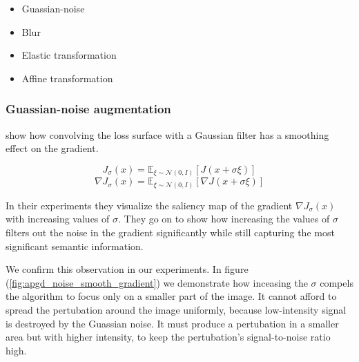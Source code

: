 \begin{itemize}
    \item Guassian-noise
    \item Blur
    \item Elastic transformation
    \item Affine transformation
\end{itemize}


\subsubsection{Guassian-noise augmentation}

\cite{Wu2020TowardsUA} show how convolving the loss surface with a Gaussian filter has a smoothing effect on the gradient.

$$J_{\sigma}(x) = \mathbb{E}_{\xi \sim \mathcal{N}(0, I)}[J(x + \sigma \xi)]$$
$$\nabla J_{\sigma}(x) = \mathbb{E}_{\xi \sim \mathcal{N}(0, I)}[\nabla J(x + \sigma \xi)]$$

In their experiments they visualize the saliency map of the gradient $\nabla J_{\sigma}(x)$ with increasing values of $\sigma$.
They go on to show how increasing the values of $\sigma$ filters out the noise in the gradient significantly while still capturing the most significant semantic information. 

We confirm this observation in our experiments. In figure (\ref{fig:apgd_noise_smooth_gradient}) we demonstrate how inceasing the $\sigma$ compels the algorithm to focus only on a smaller part of the image. It cannot afford to spread the pertubation around the image uniformly, because low-intensity signal is destroyed by the Guassian noise. It must produce a pertubation in a smaller area but with higher intensity, to keep the pertubation's signal-to-noise ratio high.


